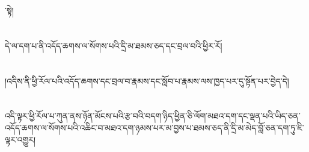 ་སྟེ།\chapter{ }དེ་ལ་དག་པ་ནི་འདོད་ཆགས་ལ་སོགས་པའི་དྲི་མ་ཐམས་ཅད་དང་བྲལ་བའི་ཕྱིར་རོ།\chapter{ }།འདིས་ནི་ཕྱི་རོལ་པའི་འདོད་ཆགས་དང་བྲལ་བ་རྣམས་དང་སློབ་པ་རྣམས་ལས་ཁྱད་པར་དུ་སྟོན་པར་བྱེད་དེ།\chapter{ }འདི་ལྟར་ཕྱི་རོལ་པ་ཀུན་ནས་ཉོན་མོངས་པའི་རྩ་བའི་བདག་ཉིད་ཕྱིན་ཅི་ལོག་མཐའ་དག་དང་ལྡན་པའི་ཡིད་ཅན་འདོད་ཆགས་ལ་སོགས་པའི་འཆིང་བ་མཐའ་དག་ཉམས་པར་མ་བྱས་པ་ཐམས་ཅད་ནི་དྲི་མ་མེད་བློ་ཅན་དག་ཏུ་ཇི་ལྟར་འགྱུར།
